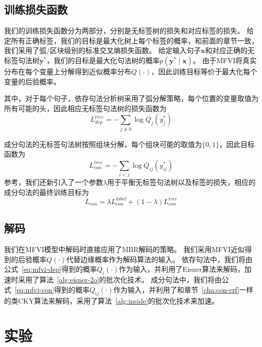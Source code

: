 \subsection{训练损失函数}

我们的训练损失函数分为两部分，分别是无标签树的损失和对应标签的损失。
给定所有正确标签，我们的目标是最大化树上每个标签的概率，和前面的章节一致，我们采用了弧/区块级别的标准交叉熵损失函数。
给定输入句子$\boldsymbol{x}$和对应正确的无标签句法树$\boldsymbol{y}^{\ast}$，我们的目标是最大化句法树的概率$p(\boldsymbol{y}^{\ast}\mid\boldsymbol{x})$。
由于MFVI将真实分布在每个变量上分解得到近似概率分布$Q(\cdot)$，因此训练目标等价于最大化每个变量的后验概率。

其中，对于每个句子，依存句法分析树采用了弧分解策略，每个位置的变量取值为所有可能的头，因此相应无标签句法树的损失函数为
\begin{equation}
	\label{eq:dep-vi-arc-loss}
	L_{dep}^{tree}=-\sum_{j\neq 0}\log Q_j(y^{\ast}_j)
\end{equation}

成分句法的无标签句法树按照组块分解，每个组块可能的取值为$\{0,1\}$，因此目标函数为
\begin{equation}
	\label{eq:con-vi-bracket-loss}
	L_{con}^{tree}=-\sum_{i<j}\log Q_{ij}(y^{\ast}_{ij})
\end{equation}
参考\citet{dozat-manning-2018-simpler}，我们还新引入了一个参数$\lambda$用于平衡无标签句法树以及标签的损失，相应的成分句法的最终训练目标为
\begin{equation}
	\label{eq:con-vi-loss}
	L_{con}=\lambda L_{con}^{label}+(1-\lambda)L_{con}^{tree}
\end{equation}

\subsection{解码}
我们在MFVI模型中解码时直接应用了MBR解码的策略。
我们采用MFVI近似得到的后验概率$Q(\cdot)$代替边缘概率作为解码算法的输入。
依存句法中，我们将由公式~\ref{eq:mfvi-dep}得到的概率$Q_i(\cdot)$作为输入，并利用了Eisner算法来解码，加速时采用了算法~\ref{alg:eisner-2o}的批次化技术。
成分句法中，我们将由公式~\ref{eq:mfvi-con}得到的概率$Q_{ij}(\cdot)$作为输入，并利用了和章节~\ref{cha:con-crf}一样的类CKY算法来解码，采用了算法~\ref{alg:inside}的批次化技术来加速。

\section{实验}\label{sec:vi-exp}

